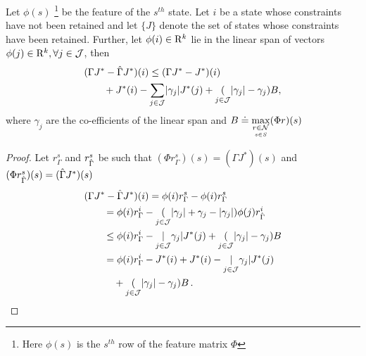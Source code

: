 \begin{theorem}
Let $\phi(s)$%
\footnote{Here $\phi(s)$ is the $s^{th}$ row of the feature matrix $\Phi$} be the feature of the $s^{th}$ state. Let $i$ be a state whose constraints have not been retained and let $\{J\}$ denote the set of states whose constraints have been retained. Further, let $\phi(i)\in \mathrm{R}^k$ lie in the linear span of vectors $\phi(j)\in \mathrm{R}^k,\forall j\in \mathcal{J}$, then
\begin{align*}
\MoveEqLeft (\Gamma J^*-\hg J^*)(i)
 \leq 
(\Gamma J^*-J^*)(i) \\
& {}+J^*(i)-\underset{j\in \J}{\sum} |\gamma_j| J^*(j)
+ \underset{j\in \J}(|\gamma_j|-\gamma_j) B,
\end{align*}
where $\gamma_j$ are the co-efficients of the linear span and $B\doteq \underset{\underset{s\in S}{r\in \mathcal{N}}}{\max}(\Phi r) (s)$
\end{theorem}
\begin{proof}
Let $r^s_{\Gamma}$ and $r^s_{\hat{\Gamma}}$ be such that $(\Phi r^s_{\Gamma})(s)=(\Gamma J^*)(s)$ and $(\Phi r^s_{\hat{\Gamma}})(s)=(\hat{\Gamma} J^*)(s)$
\begin{align*}
\MoveEqLeft (\Gamma J^*-\hg J^*)(i) 
=\phi(i) r^s_{\Gamma}- \phi(i) r^s_{\Gamma}\\
&=\phi(i) r^i_{\Gamma}- \underset{j\in \J}(|\gamma_j|+\gamma_j -|\gamma_j|)\phi(j) r^i_{\hg}\\
&\leq \phi(i) r^i_{\Gamma}- \underset{j\in \J}|\gamma_j| J^*(j) + \underset{j\in \J} (|\gamma_j|-\gamma_j)B\\
&= \phi(i) r^i_{\Gamma}- J^*(i)+ J^*(i) -\underset{j\in \J}|\gamma_j| J^*(j) \\
& \quad + \underset{j\in \J} (|\gamma_j|-\gamma_j)B\,.
\end{align*}
\end{proof}
